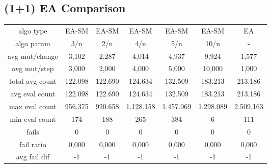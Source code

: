 \subsection{(1+1) EA Comparison}

\begin{tabular}[h]{ccccccc}
algo type&            EA-SM&     EA-SM&     EA-SM&     EA-SM&     EA-SM&        EA\\
algo param&             3/n&       2/n&       4/n&       5/n&      10/n&         -\\
avg mut/change&       3,102&     2,287&     4,014&     4,937&     9,924&     1,577\\
avg mut/step&         3,000&     2,000&     4,000&     5,000&    10,000&     1,000\\
\hline
total avg count&    122.098&   122.690&   124.634&   132.509&   183.213&   213.186\\
avg eval count&     122.098&   122.690&   124.634&   132.509&   183.213&   213.186\\
max eval count&     956.375&   920.658& 1.128.158& 1.457.069& 1.298.089& 2.509.163\\
min eval count&         174&       188&       265&       384&         6&       111\\
\hline
fails&                    0&         0&         0&         0&         0&         0\\
fail ratio&           0,000&     0,000&     0,000&     0,000&     0,000&     0,000\\
avg fail dif&            -1&        -1&        -1&        -1&        -1&        -1\\
\end{tabular}

